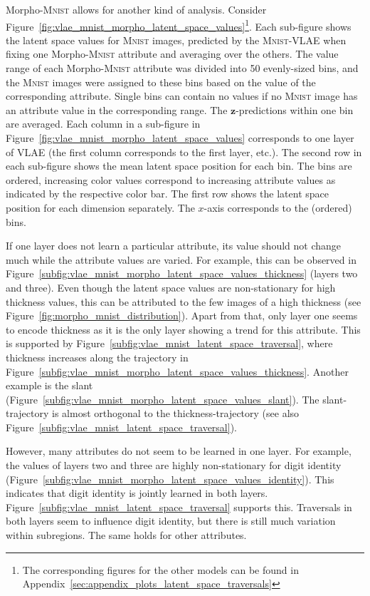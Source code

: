 Morpho-\textsc{Mnist} allows for another kind of analysis.
Consider Figure~\ref{fig:vlae_mnist_morpho_latent_space_values}\footnote{The corresponding figures for the other models can be found in Appendix~\ref{sec:appendix_plots_latent_space_traversals}}.
Each sub-figure shows the latent space values for \textsc{Mnist} images, predicted by the \textsc{Mnist}-\ac{VLAE} when fixing one Morpho-\textsc{Mnist} attribute and averaging over the others.
The value range of each Morpho-\textsc{Mnist} attribute was divided into 50 evenly-sized bins, and the \textsc{Mnist} images were assigned to these bins based on the value of the corresponding attribute.
Single bins can contain no values if no \textsc{Mnist} image has an attribute value in the corresponding range.
The $\bm{z}$-predictions within one bin are averaged.
Each column in a sub-figure in Figure~\ref{fig:vlae_mnist_morpho_latent_space_values} corresponds to one layer of \ac{VLAE} (the first column corresponds to the first layer, etc.).
The second row in each sub-figure shows the mean latent space position for each bin.
The bins are ordered, increasing color values correspond to increasing attribute values as indicated by the respective color bar.
The first row shows the latent space position for each dimension separately.
The $x$-axis corresponds to the (ordered) bins.

If one layer does not learn a particular attribute, its value should not change much while the attribute values are varied.
For example, this can be observed in Figure~\ref{subfig:vlae_mnist_morpho_latent_space_values_thickness} (layers two and three).
Even though the latent space values are non-stationary for high thickness values, this can be attributed to the few images of a high thickness (see Figure~\ref{fig:morpho_mnist_distribution}).
Apart from that, only layer one seems to encode thickness as it is the only layer showing a trend for this attribute.
This is supported by Figure~\ref{subfig:vlae_mnist_latent_space_traversal}, where thickness increases along the trajectory in Figure~\ref{subfig:vlae_mnist_morpho_latent_space_values_thickness}.
Another example is the slant (Figure~\ref{subfig:vlae_mnist_morpho_latent_space_values_slant}).
The slant-trajectory is almost orthogonal to the thickness-trajectory (see also Figure~\ref{subfig:vlae_mnist_latent_space_traversal}).

However, many attributes do not seem to be learned in one layer.
For example, the values of layers two and three are highly non-stationary for digit identity (Figure~\ref{subfig:vlae_mnist_morpho_latent_space_values_identity}).
This indicates that digit identity is jointly learned in both layers.
Figure~\ref{subfig:vlae_mnist_latent_space_traversal} supports this.
Traversals in both layers seem to influence digit identity, but there is still much variation within subregions.
The same holds for other attributes.

